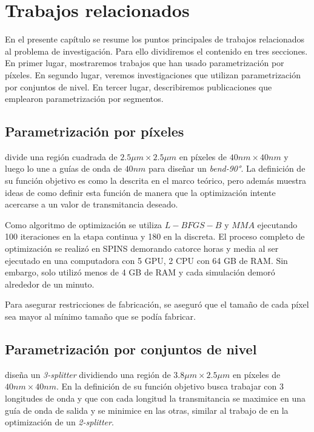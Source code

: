\chapter{Trabajos relacionados}

En el presente capítulo se resume los puntos principales de trabajos relacionados al problema de investigación.
Para ello dividiremos el contenido en tres secciones. 
En primer lugar, mostraremos trabajos que han usado parametrización por píxeles.
En segundo lugar, veremos investigaciones que utilizan parametrización por conjuntos de nivel.
En tercer lugar, describiremos publicaciones que emplearon parametrización por segmentos.

\section{Parametrización por píxeles}

\cite{Su2020} divide una región cuadrada de $2.5 \mu m \times 2.5 \mu m$ en píxeles de $40 nm \times 40 nm$ y luego lo une a guías de onda de $40 nm$ para diseñar un \emph{bend-90°}. 
La definición de su función objetivo es como la descrita en el marco teórico, pero además muestra ideas de como definir esta función de manera que la optimización intente acercarse a un valor de transmitancia deseado.

Como algoritmo de optimización se utiliza $L-BFGS-B$ y $MMA$ ejecutando 100 iteraciones en la etapa continua y 180 en la discreta.
El proceso completo de optimización se realizó en SPINS demorando catorce horas y media al ser ejecutado en una computadora con 5 GPU, 2 CPU con 64 GB de RAM.
Sin embargo, solo utilizó menos de 4 GB de RAM y cada simulación demoró alrededor de un minuto.

Para asegurar restricciones de fabricación, \cite{Su2020} se aseguró que el tamaño de cada píxel sea mayor al mínimo tamaño que se podía fabricar.

\section{Parametrización por conjuntos de nivel}

\cite{Piggott2017} diseña un \emph{3-splitter} dividiendo una región de $3.8 \mu m \times 2.5 \mu m$ en píxeles de $40 nm \times 40 nm$.
En la definición de su función objetivo busca trabajar con 3 longitudes de onda y que con cada longitud la transmitancia se maximice en una guía de onda de salida y se minimice en las otras, similar al trabajo de \cite{Su2020} en la optimización de un \emph{2-splitter}.

